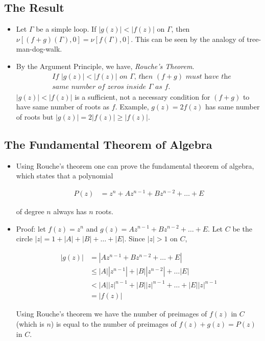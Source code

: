 \documentclass[12pt]{article}
\def\tt{\textit}
\begin{document}
\subsection{The Result}
\begin{itemize}
    \item Let $\Gamma$ be a simple loop. If $|g(z)|<|f(z)|$ on $\Gamma$, then $\nu[(f+g)(\Gamma),0] = \nu[f(\Gamma),0]$. This can be seen by the analogy of tree-man-dog-walk.
    \item By the Argument Principle, we have, \tt{Rouche's Theorem}.
    \begin{align*}
        &\tt{If $|g(z)|<|f(z)|$ on $\Gamma$, then $(f+g)$ must have the}\\
        &\tt{same number of zeros inside $\Gamma$ as $f$.}
    \end{align*}
    $|g(z)| < |f(z)|$ is a sufficient, not a necessary condition for $(f+g)$ to have same number of roots as $f$. Example, $g(z)=2f(z)$ has same number of roots but $|g(z)| = 2|f(z)| \geq |f(z)|$.
\end{itemize}

\subsection{The Fundamental Theorem of Algebra}
\begin{itemize}   
    \item Using Rouche's theorem one can prove the fundamental theorem of algebra, which states that a polynomial

    \begin{align*}
        P(z) &= z^n + Az^{n-1} + Bz^{n-2} + \ldots +E
    \end{align*}

    of degree $n$ always has $n$ roots.
    \item Proof: let $f(z) = z^n$ and $g(z) = Az^{n-1} + Bz^{n-2} +\ldots + E$. Let $C$ be the circle $|z| = 1+|A| + |B| + \ldots + |E|$. Since $|z|>1$ on $C$,
    
    \begin{align*}
        |g(z)| &= |Az^{n-1}+Bz^{n-2}+\ldots+E|\\
        &\leq |A||z^{n-1}| + |B||z^{n-2}| + \ldots |E|\\
        &< |A||z|^{n-1} + |B||z|^{n-1} + \ldots + |E||z|^{n-1}\\
        &= |f(z)|
    \end{align*}

    Using Rouche's theorem we have the number of preimages of $f(z)$ in $C$ (which is $n$) is equal to the number of preimages of $f(z)+g(z)=P(z)$ in $C$.
\end{itemize}
\end{document}
